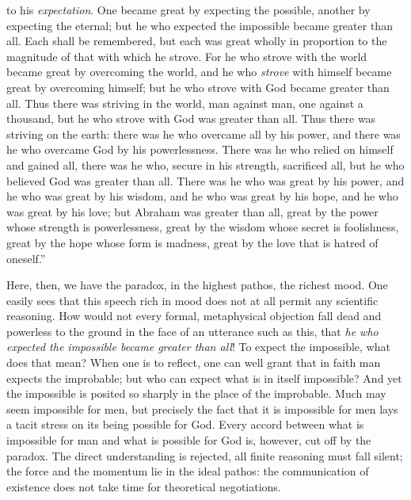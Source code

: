 \documentclass[12pt]{book}
\newcommand{\opage}[1]{\marginnote{\footnotesize\textit{[#1]}}}
\begin{document}
to his \emph{expectation}. One became great by expecting the possible,
another by expecting the eternal; but he who expected the impossible
became greater than all. Each shall be remembered, but each was great
wholly in proportion to the magnitude of that with which he strove. For
he who strove with the world became great by overcoming the world, and
he who \emph{strove} with himself became great by overcoming himself;
but he who strove with God became greater than all. Thus there was
striving in the world, man against man, one against a thousand, but he
who strove with God was greater than all. Thus there was striving on
the earth: there was he who overcame all by his power, and there was he
who overcame God by his powerlessness. There was he who relied on
himself and gained all, there was he who, secure in his strength,
sacrificed all, but he who believed God was greater than all. There was
he who was great by his power, and he who was great by his wisdom, and
he who was great by his hope, and he who was great by his love; but
Abraham was greater than all, great by the power whose strength is
powerlessness, great by the wisdom whose secret is foolishness, great by
the hope whose form is madness, great by the love that is hatred of
oneself.''

Here, then, we have the paradox, in the highest pathos, the richest
mood. One easily sees that this speech rich in mood does not at all
permit any scientific reasoning. How would not every formal,
metaphysical objection fall dead and powerless to the ground in the
face of an utterance such as this, that \emph{he who expected the
impossible became greater than all}! To expect the impossible, what
does that mean? When one is to reflect, one can well grant that in
faith man expects the improbable; but who can expect what is in itself
\opage{233}\setcounter{footnote}{0}%
impossible? And yet the impossible is posited so sharply in the place
of the improbable. Much may seem impossible for men, but precisely the
fact that it is impossible for men lays a tacit stress on its being
possible for God. Every accord between what is impossible for man and
what is possible for God is, however, cut off by the paradox. The
direct understanding is rejected, all finite reasoning must fall
silent; the force and the momentum lie in the ideal pathos: the
communication of existence does not take time for theoretical
negotiations.
\end{document}
